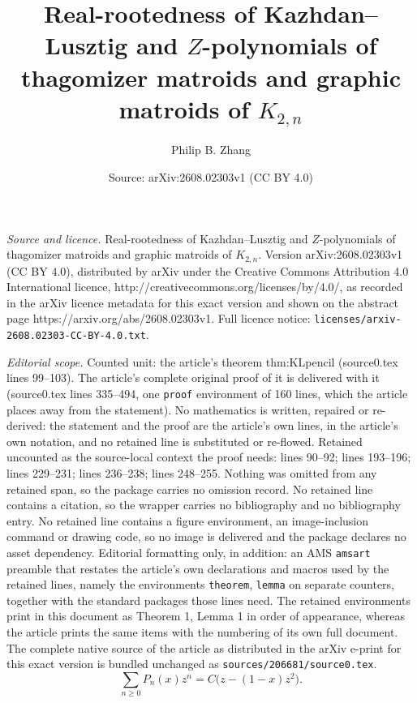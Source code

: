 \documentclass[10pt,a4paper]{amsart}
\title{Real-rootedness of Kazhdan--Lusztig and $Z$-polynomials of thagomizer matroids and graphic matroids of $K_{2,n}$}
\author{Philip B. Zhang}
\date{Source: arXiv:2608.02303v1 (CC BY 4.0)}
\begin{document}
\maketitle

\noindent\emph{Source and licence.} Real-rootedness of Kazhdan--Lusztig and $Z$-polynomials of thagomizer matroids and graphic matroids of $K_{2,n}$. Version arXiv:2608.02303v1 (CC BY 4.0), distributed by arXiv under the Creative Commons Attribution 4.0 International licence, http://creativecommons.org/licenses/by/4.0/, as recorded in the arXiv licence metadata for this exact version and shown on the abstract page https://arxiv.org/abs/2608.02303v1. Full licence notice: \texttt{licenses/arxiv-2608.02303-CC-BY-4.0.txt}.\par\smallskip

\noindent\textit{Editorial scope.} Counted unit: the article's theorem thm:KLpencil (source0.tex lines 99--103). The article's complete original proof of it is delivered with it (source0.tex lines 335--494, one \texttt{proof} environment of 160 lines, which the article places away from the statement). No mathematics is written, repaired or re-derived: the statement and the proof are the article's own lines, in the article's own notation, and no retained line is substituted or re-flowed.  Retained uncounted as the source-local context the proof needs: lines 90--92; lines 193--196; lines 229--231; lines 236--238; lines 248--255.  Nothing was omitted from any retained span, so the package carries no omission record.  No retained line contains a citation, so the wrapper carries no bibliography and no bibliography entry.  No retained line contains a figure environment, an image-inclusion command or drawing code, so no image is delivered and the package declares no asset dependency.  Editorial formatting only, in addition: an AMS \texttt{amsart} preamble that restates the article's own declarations and macros used by the retained lines, namely the environments \texttt{theorem}, \texttt{lemma} on separate counters, together with the standard packages those lines need.  The retained environments print in this document as Theorem 1, Lemma 1 in order of appearance, whereas the article prints the same items with the numbering of its own full document.  The complete native source of the article as distributed in the arXiv e-print for this exact version is bundled unchanged as \texttt{sources/206681/source0.tex}.
\begin{equation}\label{eq:ThagGF}
   \sum_{n\ge0}P_n(x)z^n=C\bigl(z-(1-x)z^2\bigr).
\end{equation}
\end{document}
